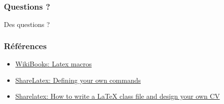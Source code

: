 \documentclass{clic_latex_beamer}
\begin{document}
 
 
\begin{frame}
\frametitle{Questions ?}
\begin{center}
\Huge Des questions ?
\end{center}
\end{frame}
 
\begin{frame}
\frametitle{Références}
\begin{itemize}
\item \href{http://en.wikibooks.org/wiki/LaTeX/Macros}{WikiBooks: Latex macros}
\item \href{http://www.sharelatex.com/learn/Defining_your_own_commands}{ShareLatex: Defining your own commands}
\item \href{https://www.sharelatex.com/blog/2011/03/27/how-to-write-a-latex-class-file-and-design-your-own-cv.html}{Sharelatex: How to write a LaTeX class file and design your own CV}
\end{itemize}
\end{frame}
\end{document}
